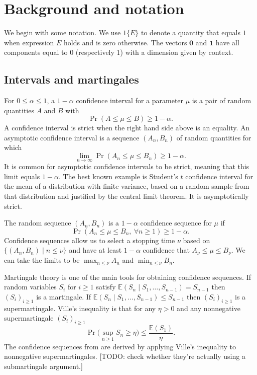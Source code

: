 \documentclass{article}
\newcommand{\art}[1]{\begingroup\color{blue}#1\endgroup}
\renewcommand{\le}{\leqslant}
\renewcommand{\ge}{\geqslant}
\newcommand{\e}{\mathbb{E}}
\newcommand{\bsone}{\boldsymbol{1}}
\newcommand{\bszero}{\boldsymbol{0}}
\newcommand{\giv}{\!\mid\!} %
\begin{document}
\section{Background and notation}\label{sec:notation}

We begin with some notation.
We use $1\{E\}$ to denote a quantity that equals $1$
when expression $E$ holds and is zero otherwise.
The vectors $\bszero$ and $\bsone$ have all components
equal to $0$ (respectively $1$) with a dimension
given by context.

\subsection{Intervals and martingales}

For $0\le\alpha\le 1$, a $1-\alpha$ confidence interval for a 
parameter $\mu$ is a pair of random quantities $A$ and $B$ with
$$
\Pr( A\le \mu\le B)\ge 1-\alpha.
$$
A confidence interval is strict when the right hand
side above is an equality.
An asymptotic confidence interval is a sequence $(A_n,B_n)$
of random quantities for which
$$
\lim_{n\to\infty}\Pr( A_n\le \mu\le B_n)\ge 1-\alpha.
$$
It is common for asymptotic confidence intervals to
be strict, meaning that this limit equals $1-\alpha$.
The best known example is Student's $t$ confidence
interval for the mean of a distribution with finite
variance, based on a random sample 
from that distribution and justified by the
central limit theorem.  It is asymptotically strict.

The random sequence $(A_n,B_n)$ is a $1-\alpha$ confidence sequence
for $\mu$ if
$$
\Pr( A_n \le \mu \le B_n,\ \forall n\ge1)\ge 1-\alpha.
$$
Confidence sequences allow us to select a stopping time
$\nu$ based on $\{(A_n,B_n)\mid n\le\nu\}$ and have
at least $1-\alpha$ confidence that $A_\nu\le \mu\le B_\nu$.
We can take the limits to be $\max_{n\le \nu}A_n$
and $\min_{n\le\nu}B_n$.

Martingale theory is one of the main tools for
obtaining confidence sequences.
If random variables $S_i$ for $i\ge1$
satisfy $\e(S_n\giv S_1,\dots,S_{n-1})=S_{n-1}$
then $(S_i)_{i\ge1}$ is a martingale.
If $\e(S_n\giv S_1,\dots,S_{n-1})\le S_{n-1}$
then $(S_i)_{i\ge1}$ is a supermartingale.
Ville's inequality is that for any $\eta>0$
and any nonnegative supermartingale $(S_i)_{i\ge1}$
$$
\Pr\biggl( \sup_{n\ge1}S_n\ge \eta\biggr)\le\frac{\e(S_1)}\eta.
$$
The confidence sequences from \cite{WauRam24a} are derived
by applying Ville's inequality \cite{vill:1939} to nonnegative supermartingales.
\art{[TODO: check whether they're actually using a submartingale argument.]}
\end{document}
